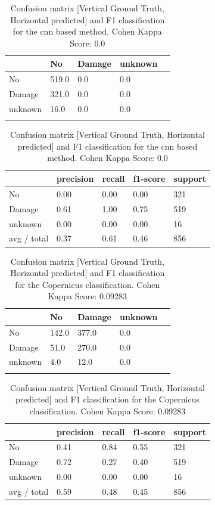 \begin{table} [H]
	\footnotesize
	\captionsetup{justification=raggedright,singlelinecheck=false}
	\caption{Confusion matrix [Vertical Ground Truth, Horizontal predicted] and F1 classification for the \ac{cnn} based method. Cohen Kappa Score: 0.0 }	
	\begin{tabular}{l|llll}
		& No    & Damage & unknown &  \\ \hline
		No      & 519.0 & 0.0    & 0.0     &  \\
		Damage  & 321.0 & 0.0    & 0.0     &  \\
		unknown & 16.0  & 0.0    & 0.0     &  \\
		&       &        &         & 
	\end{tabular}
	\begin{tabular}{l|llll}
		& precision & recall & f1-score & support \\ \hline
		No          & 0.00      & 0.00   & 0.00     & 321     \\
		Damage      & 0.61      & 1.00   & 0.75     & 519     \\
		unknown     & 0.00      & 0.00   & 0.00     & 16      \\
		avg / total & 0.37      & 0.61   & 0.46     & 856    
	\end{tabular}
	\label{tab:matCNN}
\end{table}

\begin{table} [H]
	\footnotesize
	\captionsetup{justification=raggedright,singlelinecheck=false}
	\caption{Confusion matrix [Vertical Ground Truth, Horizontal predicted] and F1 classification for the Copernicus classification. Cohen Kappa Score: 0.09283 }
	\begin{tabular}{l|llll}
		& No    & Damage & unknown &  \\ \hline
		No      & 142.0 & 377.0  & 0.0     &  \\
		Damage  & 51.0  & 270.0  & 0.0     &  \\
		unknown & 4.0   & 12.0   & 0.0     &  \\
		&       &        &         & 
	\end{tabular}
	\begin{tabular}{l|llll}
		& precision & recall & f1-score & support \\ \hline
		No          & 0.41      & 0.84   & 0.55     & 321     \\
		Damage      & 0.72      & 0.27   & 0.40     & 519     \\
		unknown     & 0.00      & 0.00   & 0.00     & 16      \\
		avg / total & 0.59      & 0.48   & 0.45     & 856    
	\end{tabular}
	\label{tab:matCop}
\end{table}

